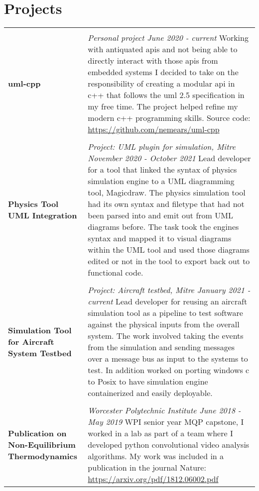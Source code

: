 \documentclass[10pt]{article}
\begin{document}
\section*{Projects}
\begin{tabular}[t]{p{4cm} p{14cm}}
  \hline
  \multicolumn{2}{c}{} \\
  \large \textbf{uml-cpp} &
  \textit{Personal project \hfill June 2020 - current} \newline
  Working with antiquated apis and not being able to directly interact with those apis from embedded systems I decided to take on the responsibility of creating a modular api in c++ that follows the uml 2.5 specification in my free time. The project helped refine my modern c++ programming skills. Source code: \url{https://github.com/nemears/uml-cpp} \\
  \multicolumn{2}{c}{} \\
  \large \textbf{Physics Tool UML Integration} &
  \textit{Project: UML plugin for simulation, Mitre \hfill November 2020 - October 2021} \newline
  Lead developer for a tool that linked the syntax of physics simulation engine to a UML diagramming tool, Magicdraw. The physics simulation tool had its own syntax and filetype that had not been parsed into and emit out from UML diagrams before. The task took the engines syntax and mapped it to visual diagrams within the UML tool and used those diagrams edited or not in the tool to export back out to functional code. \\
  \multicolumn{2}{c}{} \\
  \raggedright
  \large \textbf{Simulation Tool for Aircraft System Testbed} &
  \textit{Project: Aircraft testbed, Mitre \hfill January 2021 - current} \newline
  Lead developer for reusing an aircraft simulation tool as a pipeline to test software against the physical inputs from the overall system. The work involved taking the events from the simulation and sending messages over a message bus as input to the systems to test. In addition worked on porting windows c to Posix to have simulation engine containerized and easily deployable.\\
  \multicolumn{2}{c}{} \\
  \raggedright
  \large \textbf{Publication on Non-Equilibrium Thermodynamics} &
  \textit{Worcester Polytechnic Institute \hfill June 2018 - May 2019} \newline
  WPI senior year MQP capstone, I worked in a lab as part of a team where I developed python convolutional video analysis algorithms. My work was included in a publication in the journal Nature: \url{https://arxiv.org/pdf/1812.06002.pdf} \\
\end{tabular}
\end{document}
